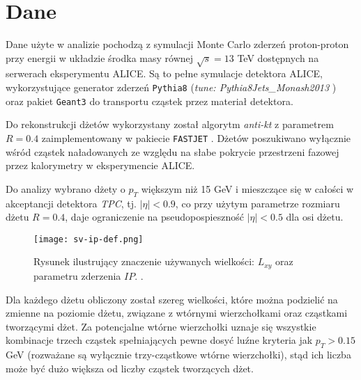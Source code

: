 \section{Dane}
\label{sec:dane}


Dane użyte w analizie pochodzą z symulacji Monte Carlo zderzeń proton-proton przy energii w układzie środka masy równej $\sqrt{s} = 13$ TeV dostępnych na serwerach eksperymentu ALICE.
Są to pełne symulacje detektora ALICE, wykorzystujące generator zderzeń \texttt{Pythia8} \cite{Sjostrand:2007gs} (\textit{tune: Pythia8Jets\_Monash2013} \cite{Skands:2014pea}) oraz pakiet \texttt{Geant3} \cite{Brun:1994aa} do transportu cząstek przez materiał detektora.

Do rekonstrukcji dżetów wykorzystany został algorytm \textit{anti-kt} z parametrem $R = 0.4$ zaimplementowany w pakiecie \texttt{FASTJET} \cite{Cacciari:2011ma}. Dżetów poszukiwano wyłącznie wśród cząstek naładowanych  ze względu na słabe pokrycie przestrzeni fazowej przez kalorymetry w eksperymencie ALICE.

Do analizy wybrano dżety o $p_T$ większym niż 15 GeV i mieszczące się w całości w akceptancji detektora \textit{TPC}, tj. $|\eta| < 0.9$, co przy użytym parametrze rozmiaru dżetu $R = 0.4$, daje ograniczenie na pseudopospieszność $|\eta| < 0.5$ dla osi dżetu.

\begin{figure}[ht]
	\centering
	\texttt{[image: sv-ip-def.png]}
	\caption{Rysunek ilustrujący znaczenie używanych wielkości: $L_{xy}$ oraz parametru zderzenia $IP$. .}
	\label{fig:sv-ip-def}
\end{figure}

Dla każdego dżetu obliczony został szereg wielkości, które można podzielić na zmienne na poziomie dżetu, związane z wtórnymi wierzchołkami oraz cząstkami tworzącymi dżet. 
Za potencjalne wtórne wierzchołki uznaje się wszystkie kombinacje trzech cząstek spełniających pewne dosyć luźne kryteria jak $p_T > 0.15$ GeV (rozważane są wyłącznie trzy-cząstkowe wtórne wierzchołki), stąd ich liczba może być dużo większa od liczby cząstek tworzących dżet.


